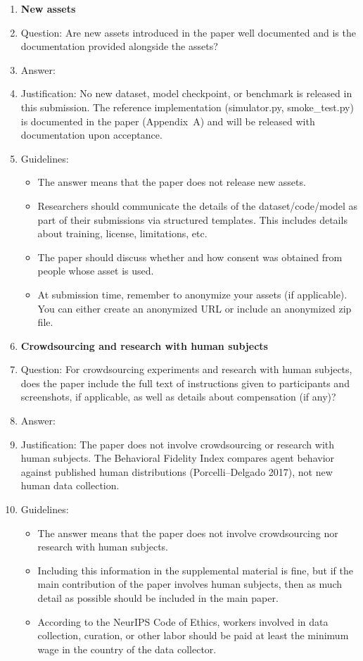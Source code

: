 \begin{enumerate}
\item {\bf New assets}
    \item[] Question: Are new assets introduced in the paper well documented and is the documentation provided alongside the assets?
    \item[] Answer: \answerNA{}
    \item[] Justification: No new dataset, model checkpoint, or benchmark is released in this submission. The reference implementation (simulator.py, smoke\_test.py) is documented in the paper (Appendix~A) and will be released with documentation upon acceptance.
    \item[] Guidelines:
    \begin{itemize}
        \item The answer \answerNA{} means that the paper does not release new assets.
        \item Researchers should communicate the details of the dataset\slash code\slash model as part of their submissions via structured templates. This includes details about training, license, limitations, etc. 
        \item The paper should discuss whether and how consent was obtained from people whose asset is used.
        \item At submission time, remember to anonymize your assets (if applicable). You can either create an anonymized URL or include an anonymized zip file.
    \end{itemize}

\item {\bf Crowdsourcing and research with human subjects}
    \item[] Question: For crowdsourcing experiments and research with human subjects, does the paper include the full text of instructions given to participants and screenshots, if applicable, as well as details about compensation (if any)? 
    \item[] Answer: \answerNA{}
    \item[] Justification: The paper does not involve crowdsourcing or research with human subjects. The Behavioral Fidelity Index compares agent behavior against published human distributions (Porcelli--Delgado 2017), not new human data collection.
    \item[] Guidelines:
    \begin{itemize}
        \item The answer \answerNA{} means that the paper does not involve crowdsourcing nor research with human subjects.
        \item Including this information in the supplemental material is fine, but if the main contribution of the paper involves human subjects, then as much detail as possible should be included in the main paper. 
        \item According to the NeurIPS Code of Ethics, workers involved in data collection, curation, or other labor should be paid at least the minimum wage in the country of the data collector. 
    \end{itemize}


\end{enumerate}
